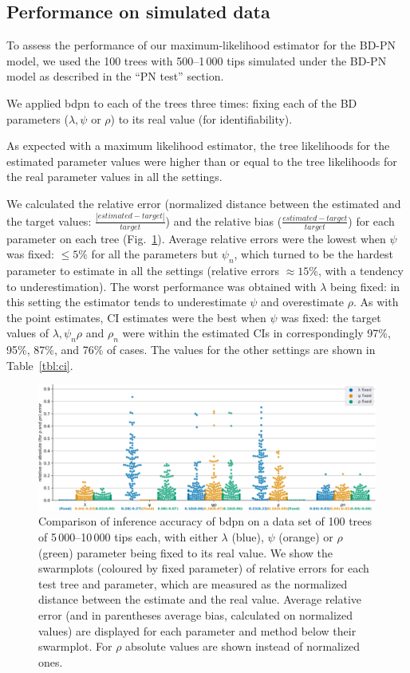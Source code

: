 \documentclass[a4paper,10pt]{article}
\begin{document}
\subsection{Performance on simulated data}

To assess the performance of our maximum-likelihood estimator for the BD-PN model, we used the 100 trees with 500--1\,000 tips simulated under the BD-PN model as described in the ``PN test'' section.

We applied bdpn to each of the trees three times: fixing each of the BD parameters ($\lambda,\psi$ or $\rho$) to its real value (for identifiability). 


As expected with a maximum likelihood estimator, the tree likelihoods for the estimated parameter values were higher than or equal to the tree likelihoods for the real parameter values in all the settings.

We calculated the relative error (normalized distance between the estimated and the target values: $\frac{|estimated - target|}{target}$) and the relative bias ($\frac{estimated - target}{target}$) for each parameter on each tree (Fig.~\ref{fig:sim}). 
Average relative errors were the lowest when $\psi$ was fixed: $\leq 5\%$  for all the parameters but $\psi_n$, which turned to be the hardest parameter to estimate in all the settings (relative errors $\approx 15\%$, with a tendency to underestimation). 
The worst performance was obtained with $\lambda$ being fixed: in this setting the estimator tends to underestimate $\psi$ and overestimate $\rho$.
As with the point estimates, CI estimates were the best when $\psi$ was fixed: the target values of $\lambda, \psi_{n} \rho$ and $\rho_n$ were within the estimated CIs in correspondingly 97\%, 95\%, 87\%, and 76\% of cases. The values for the other settings are shown in Table~\ref{tbl:ci}.

\begin{figure}[!pht]
\centering 
\includegraphics[width=1\textwidth]{Fig_errors.eps}
\caption{Comparison of inference accuracy of bdpn on a data set of 100 trees of 5\,000--10\,000 tips each, with either $\lambda$ (blue), $\psi$ (orange) or $\rho$ (green) parameter being fixed to its real value.
We show the swarmplots (coloured by fixed parameter) of relative errors for each test tree and parameter, which are measured as the normalized distance between the estimate and the real value. Average relative error (and in parentheses average bias, calculated on normalized values) are displayed for each parameter and method below their swarmplot. For $\rho$ absolute values are shown instead of normalized ones. } 
\label{fig:sim} 
\end{figure}
 
\end{document}
